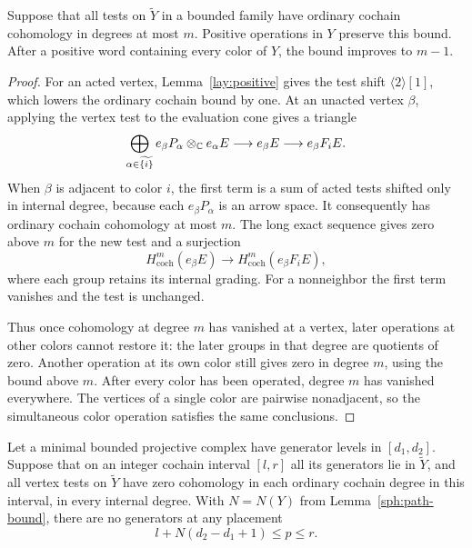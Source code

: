 \begin{lemma}\label{sph:cochain-drop}
Suppose that all tests on \(\widetilde Y\) in a bounded
family have ordinary cochain cohomology in degrees at
most \(m\).  Positive operations in \(Y\) preserve this
bound.  After a positive word containing every color of
\(Y\), the bound improves to \(m-1\).
\end{lemma}

\begin{proof}
For an acted vertex, Lemma~\ref{lay:positive} gives the
test shift \(\langle2\rangle[1]\), which lowers the
ordinary cochain bound by one.
At an unacted vertex \(\beta\), applying the vertex test
to the evaluation cone gives a triangle
\[
 \bigoplus_{\alpha\in\widetilde{\{i\}}}
      e_\beta P_\alpha\otimes_{\mathbb C}e_\alpha E
       \longrightarrow e_\beta E
       \longrightarrow e_\beta F_iE .
\]
When \(\beta\) is adjacent to color \(i\), the first term
is a sum of acted tests shifted only in internal degree,
because each \(e_\beta P_\alpha\) is an arrow space.
It consequently has ordinary cochain cohomology at
most \(m\).  The long exact sequence gives zero above
\(m\) for the new test and a surjection
\[
 H^m_{\mathrm{coch}}(e_\beta E)
       \longrightarrow H^m_{\mathrm{coch}}(e_\beta F_iE),
\]
where each group retains its internal grading.
For a nonneighbor the first term vanishes and the test
is unchanged.

Thus once cohomology at degree \(m\) has vanished at a
vertex, later operations at other colors cannot restore
it: the later groups in that degree are quotients of
zero.  Another operation at its own color still gives
zero in degree \(m\), using the bound above \(m\).
After every color has been operated, degree \(m\) has
vanished everywhere.  The vertices of a single color
are pairwise nonadjacent, so the simultaneous color
operation satisfies the same conclusions.
\end{proof}

\begin{lemma}\label{sph:empty-placement}
Let a minimal bounded projective complex have generator
levels in \([d_1,d_2]\).  Suppose that on an integer
cochain interval \([l,r]\) all its generators lie in
\(\widetilde Y\), and all vertex tests on
\(\widetilde Y\) have zero cohomology in each ordinary
cochain degree in this interval, in every internal
degree.  With \(N=N(Y)\) from Lemma~\ref{sph:path-bound},
there are no generators at any placement
\[
 l+N(d_2-d_1+1)\leq p\leq r.
\]
\end{lemma}

